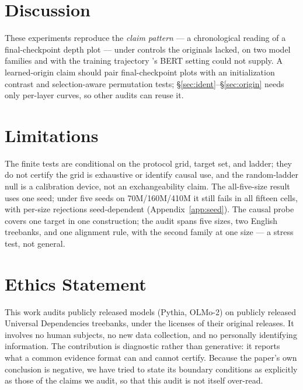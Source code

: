 \documentclass[11pt]{article}
\begin{document}
\section{Discussion}
\label{sec:disc}

These experiments reproduce the \emph{claim pattern} --- a chronological reading of a final-checkpoint depth plot --- under controls the originals lacked, on two model families and with the training trajectory \citet{niu2022doesbert}'s BERT setting could not supply. A learned-origin claim should pair final-checkpoint plots with an initialization contrast and selection-aware permutation tests; \S\ref{sec:ident}--\S\ref{sec:origin} needs only per-layer curves, so other audits can reuse it.

\section*{Limitations}
\label{sec:lim}

The finite tests are conditional on the protocol grid, target set, and ladder; they do not certify the grid is exhaustive or identify causal use, and the random-ladder null is a calibration device, not an exchangeability claim. The all-five-size result uses one seed; under five seeds on 70M/160M/410M it still fails in all fifteen cells, with per-size rejections seed-dependent (Appendix~\ref{app:seed}). The causal probe covers one target in one construction; the audit spans five sizes, two English treebanks, and one alignment rule, with the second family at one size --- a stress test, not general.

\section*{Ethics Statement}
This work audits publicly released models (Pythia, OLMo-2) on publicly released Universal Dependencies treebanks, under the licenses of their original releases. It involves no human subjects, no new data collection, and no personally identifying information. The contribution is diagnostic rather than generative: it reports what a common evidence format can and cannot certify. Because the paper's own conclusion is negative, we have tried to state its boundary conditions as explicitly as those of the claims we audit, so that this audit is not itself over-read.


\end{document}
